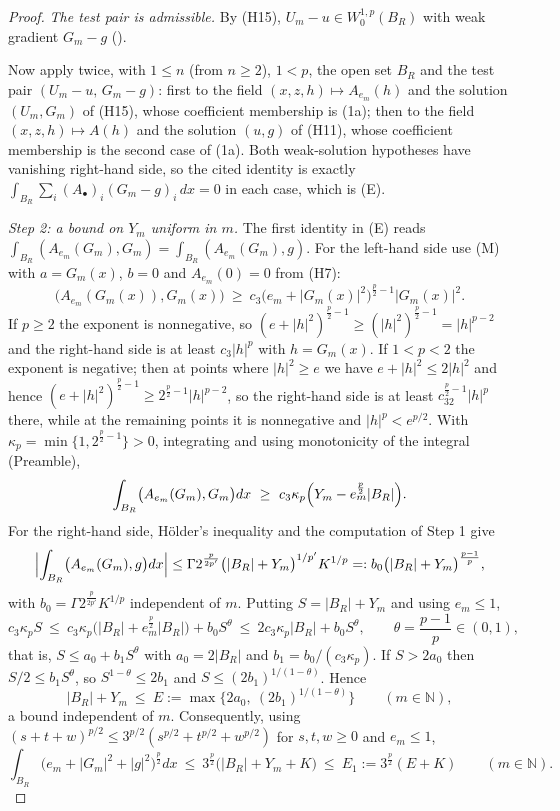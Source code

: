 \begin{proof}
\emph{The test pair is admissible.}  By (H15), $U_m-u\in W^{1,p}_0(B_R)$ with
weak gradient $G_m-g$ ().

Now apply  twice, with $1\le n$ (from $n\ge2$),
$1<p$, the open set $B_R$ and the test pair $(U_m-u,\,G_m-g)$: first to the
field $(x,z,h)\mapsto A_{e_m}(h)$ and the solution $(U_m,G_m)$ of (H15), whose
coefficient membership is (1a); then to the field $(x,z,h)\mapsto A(h)$ and the
solution $(u,g)$ of (H11), whose coefficient membership is the second case of
(1a).  Both weak-solution hypotheses have vanishing right-hand side, so the
cited identity is exactly $\int_{B_R}\sum_i(A_\bullet)_i(G_m-g)_i\,dx=0$ in each
case, which is (E).

\emph{Step 2: a bound on $Y_m$ uniform in $m$.}  The first identity in (E)
reads $\int_{B_R}(A_{e_m}(G_m),G_m)=\int_{B_R}(A_{e_m}(G_m),g)$.  For the
left-hand side use (M) with $a=G_m(x)$, $b=0$ and $A_{e_m}(0)=0$ from (H7):
\[
\bigl(A_{e_m}(G_m(x)),G_m(x)\bigr)
\ \ge\ c_3\bigl(e_m+|G_m(x)|^2\bigr)^{\frac p2-1}|G_m(x)|^2 .
\]
If $p\ge2$ the exponent is nonnegative, so
$(e+|h|^2)^{\frac p2-1}\ge(|h|^2)^{\frac p2-1}=|h|^{p-2}$ and the right-hand
side is at least $c_3|h|^p$ with $h=G_m(x)$.  If $1<p<2$ the exponent is
negative; then at points where $|h|^2\ge e$ we have $e+|h|^2\le2|h|^2$ and hence
$(e+|h|^2)^{\frac p2-1}\ge2^{\frac p2-1}|h|^{p-2}$, so the right-hand side is at
least $c_32^{\frac p2-1}|h|^p$ there, while at the remaining points it is
nonnegative and $|h|^p<e^{p/2}$.  With $\kappa_p=\min\{1,2^{\frac p2-1}\}>0$,
integrating and using monotonicity of the integral (Preamble),
\[
\int_{B_R}\bigl(A_{e_m}(G_m),G_m\bigr)dx
\ \ge\ c_3\kappa_p\Bigl(Y_m-e_m^{\frac p2}|B_R|\Bigr).
\]
For the right-hand side, Hölder's inequality and the computation of Step 1 give
\[
\Bigl|\int_{B_R}\bigl(A_{e_m}(G_m),g\bigr)dx\Bigr|
\le\Gamma2^{\frac p{2p'}}\bigl(|B_R|+Y_m\bigr)^{1/p'}K^{1/p}
=:b_0\bigl(|B_R|+Y_m\bigr)^{\frac{p-1}p},
\]
with $b_0=\Gamma2^{\frac p{2p'}}K^{1/p}$ independent of $m$.  Putting
$S=|B_R|+Y_m$ and using $e_m\le1$,
\[
c_3\kappa_pS\ \le\ c_3\kappa_p\bigl(|B_R|+e_m^{\frac p2}|B_R|\bigr)+b_0S^{\theta}
\ \le\ 2c_3\kappa_p|B_R|+b_0S^{\theta},
\qquad \theta=\frac{p-1}p\in(0,1),
\]
that is, $S\le a_0+b_1S^{\theta}$ with $a_0=2|B_R|$ and
$b_1=b_0/(c_3\kappa_p)$.  If $S>2a_0$ then $S/2\le b_1S^{\theta}$, so
$S^{1-\theta}\le2b_1$ and $S\le(2b_1)^{1/(1-\theta)}$.  Hence
\[
|B_R|+Y_m\ \le\ E:=\max\bigl\{2a_0,\ (2b_1)^{1/(1-\theta)}\bigr\}
\qquad(m\in\mathbb{N}),
\tag{2a}
\]
a bound independent of $m$.  Consequently, using
$(s+t+w)^{p/2}\le3^{p/2}(s^{p/2}+t^{p/2}+w^{p/2})$ for $s,t,w\ge0$ and
$e_m\le1$,
\[
\int_{B_R}\bigl(e_m+|G_m|^2+|g|^2\bigr)^{\frac p2}dx
\ \le\ 3^{\frac p2}\bigl(|B_R|+Y_m+K\bigr)\ \le\ E_1:=3^{\frac p2}(E+K)
\qquad(m\in\mathbb{N}).
\tag{2b}
\]


\end{proof}
